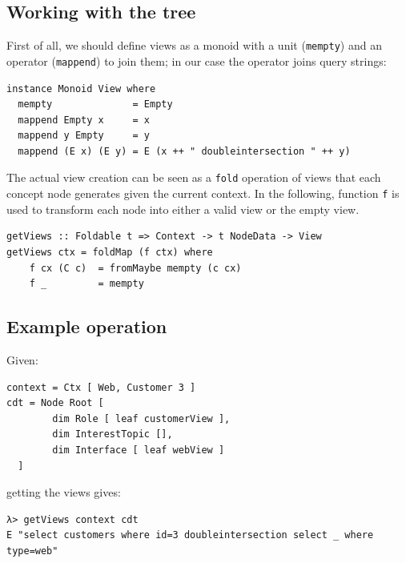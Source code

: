 \documentclass[12pt,a4]{article}
\begin{document}
\subsection{Working with the tree}
\label{sec:orgheadline3}

First of all, we should define views as a monoid with a unit (\texttt{mempty}) and an
operator (\texttt{mappend}) to join them; in our case the operator joins query strings:

\begin{verbatim}
instance Monoid View where
  mempty              = Empty
  mappend Empty x     = x
  mappend y Empty     = y
  mappend (E x) (E y) = E (x ++ " doubleintersection " ++ y)
\end{verbatim}

The actual view creation can be seen as a \texttt{fold} operation of views that each
concept node generates given the current context. In the following, function \texttt{f}
is used to transform each node into either a valid view or the empty view.  

\begin{verbatim}
getViews :: Foldable t => Context -> t NodeData -> View
getViews ctx = foldMap (f ctx) where 
    f cx (C c)  = fromMaybe mempty (c cx) 
    f _         = mempty
\end{verbatim}

\subsection{Example operation}
\label{sec:orgheadline4}

Given:

\begin{verbatim}
context = Ctx [ Web, Customer 3 ]
cdt = Node Root [
        dim Role [ leaf customerView ],
        dim InterestTopic [],
        dim Interface [ leaf webView ]
  ]
\end{verbatim}

getting the views gives:

\begin{verbatim}
λ> getViews context cdt
E "select customers where id=3 doubleintersection select _ where type=web"
\end{verbatim}
\end{document}

